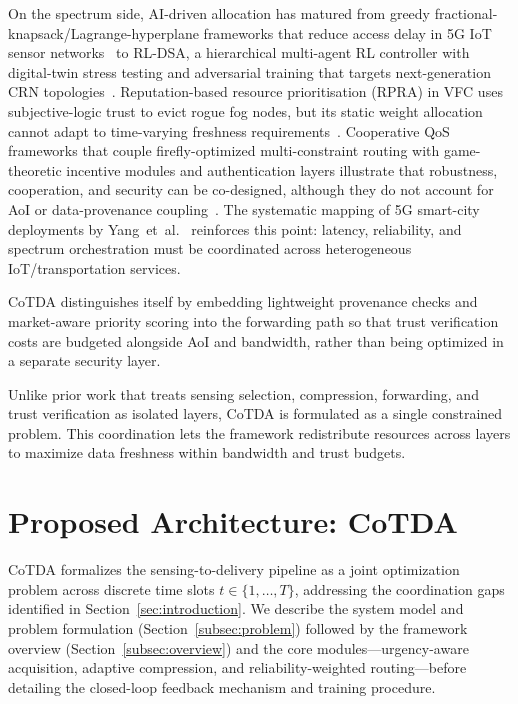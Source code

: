\documentclass[final,3p,times,review,sort&compress]{elsarticle}
\begin{document}
On the spectrum side, AI-driven allocation has matured from greedy fractional-knapsack/Lagrange-hyperplane frameworks that reduce access delay in 5G IoT sensor networks~\cite{SEKARAN2021107649} to RL-DSA, a hierarchical multi-agent RL controller with digital-twin stress testing and adversarial training that targets next-generation CRN topologies~\cite{VENKATESAN2026112217}.  Reputation-based resource prioritisation (RPRA) in VFC uses subjective-logic trust to evict rogue fog nodes, but its static weight allocation cannot adapt to time-varying freshness requirements~\cite{KHATTAK2024103401}.  Cooperative QoS frameworks that couple firefly-optimized multi-constraint routing with game-theoretic incentive modules and authentication layers illustrate that robustness, cooperation, and security can be co-designed, although they do not account for AoI or data-provenance coupling~\cite{RAJPUT2022100423}.  The systematic mapping of 5G smart-city deployments by Yang~et~al.~\cite{YANG2022200065} reinforces this point: latency, reliability, and spectrum orchestration must be coordinated across heterogeneous IoT/transportation services.

CoTDA distinguishes itself by embedding lightweight provenance checks and market-aware priority scoring into the forwarding path so that trust verification costs are budgeted alongside AoI and bandwidth, rather than being optimized in a separate security layer.

Unlike prior work that treats sensing selection, compression, forwarding, and trust verification as isolated layers, CoTDA is formulated as a single constrained problem. This coordination lets the framework redistribute resources across layers to maximize data freshness within bandwidth and trust budgets.


\section{Proposed Architecture: CoTDA}
\label{sec:method}

CoTDA formalizes the sensing-to-delivery pipeline as a joint optimization problem across discrete time slots $t\in\{1,\dots,T\}$, addressing the coordination gaps identified in Section~\ref{sec:introduction}. We describe the system model and problem formulation (Section~\ref{subsec:problem}) followed by the framework overview (Section~\ref{subsec:overview}) and the core modules---urgency-aware acquisition, adaptive compression, and reliability-weighted routing---before detailing the closed-loop feedback mechanism and training procedure.
\end{document}
